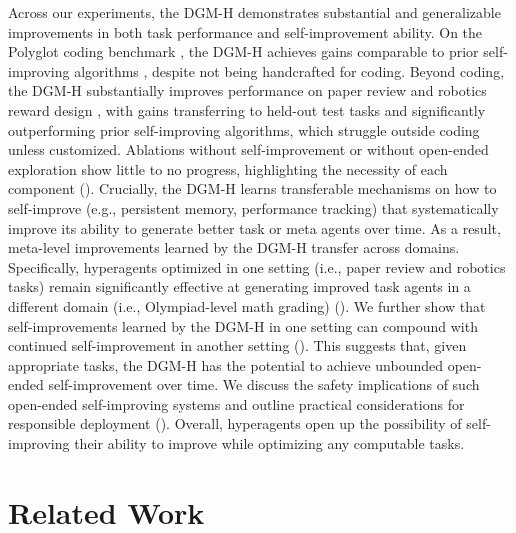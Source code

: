 \documentclass[]{fairmeta}
\begin{document}
Across our experiments, the DGM-H demonstrates substantial and generalizable improvements in both task performance and self-improvement ability. On the Polyglot coding benchmark \citep{gauthier2024polyglot}, the DGM-H achieves gains comparable to prior self-improving algorithms \citep[the Darwin G\"odel Machine,][]{zhang2025darwin}, despite not being handcrafted for coding. Beyond coding, the DGM-H substantially improves performance on paper review \citep{zhao2026apres} and robotics reward design \citep{genesis2024}, with gains transferring to held-out test tasks and significantly outperforming prior self-improving algorithms, which struggle outside coding unless customized. Ablations without self-improvement or without open-ended exploration show little to no progress, highlighting the necessity of each component (). Crucially, the DGM-H learns transferable mechanisms on how to self-improve (e.g., persistent memory, performance tracking) that systematically improve its ability to generate better task or meta agents over time. As a result, meta-level improvements learned by the DGM-H transfer across domains. Specifically, hyperagents optimized in one setting (i.e., paper review and robotics tasks) remain significantly effective at generating improved task agents in a different domain (i.e., Olympiad-level math grading) (). We further show that self-improvements learned by the DGM-H in one setting can compound with continued self-improvement in another setting (). This suggests that, given appropriate tasks, the DGM-H has the potential to achieve unbounded open-ended self-improvement over time.
We discuss the safety implications of such open-ended self-improving systems and outline practical considerations for responsible deployment (). Overall, hyperagents open up the possibility of self-improving their ability to improve while optimizing any computable tasks.

\section{Related Work}
\label{sec:related-work}
\end{document}
